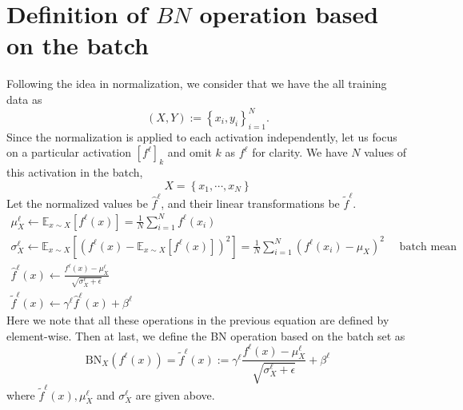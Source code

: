 \documentclass[10pt]{article}
\begin{document}
\section{Definition of $B N$ operation based on the batch}
Following the idea in normalization, we consider that we have the all training data as
$$
(X, Y):=\left\{x_{i}, y_{i}\right\}_{i=1}^{N} .
$$
Since the normalization is applied to each activation independently, let us focus on a particular activation $\left[f^{\ell}\right]_{k}$ and omit $k$ as $f^{\ell}$ for clarity. We have $N$ values of this activation in the batch,
$$
X=\left\{x_{1}, \cdots, x_{N}\right\}
$$
Let the normalized values be $\hat{f}^{\ell}$, and their linear transformations be $\tilde{f}^{\ell} .$
$$
\begin{gathered}
\mu_{X}^{\ell} \leftarrow \mathbb{E}_{x \sim X}\left[f^{\ell}(x)\right]=\frac{1}{N} \sum_{i=1}^{N} f^{\ell}\left(x_{i}\right) \\
\sigma_{X}^{\ell} \leftarrow \mathbb{E}_{x \sim X}\left[\left(f^{\ell}(x)-\mathbb{E}_{x \sim X}\left[f^{\ell}(x)\right]\right)^{2}\right]=\frac{1}{N} \sum_{i=1}^{N}\left(f^{\ell}\left(x_{i}\right)-\mu_{X}\right)^{2} \quad \text { batch mean } \\
\hat{f}^{\ell}(x) \leftarrow \frac{f^{\ell}(x)-\mu_{X}^{\ell}}{\sqrt{\sigma_{X}^{\ell}+\epsilon}} \\
\tilde{f}^{\ell}(x) \leftarrow \gamma^{\ell} \hat{f}^{\ell}(x)+\beta^{\ell}
\end{gathered}
$$
Here we note that all these operations in the previous equation are defined by element-wise. Then at last, we define the BN operation based on the batch set as
$$
\mathrm{BN}_{X}\left(f^{\ell}(x)\right)=\tilde{f}^{\ell}(x):=\gamma^{\ell} \frac{f^{\ell}(x)-\mu_{X}^{\ell}}{\sqrt{\sigma_{X}^{\ell}+\epsilon}}+\beta^{\ell}
$$
where $\tilde{f}^{\ell}(x), \mu_{X}^{\ell}$ and $\sigma_{X}^{\ell}$ are given above.
\end{document}
